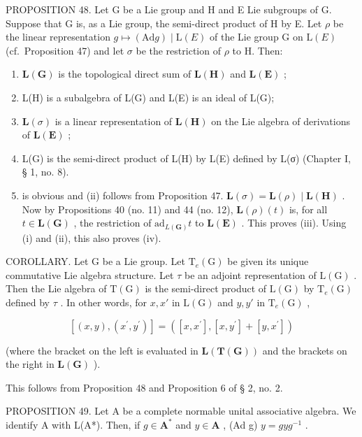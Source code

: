 PROPOSITION 48. Let G be a Lie group and H and E Lie subgroups of G. Suppose that G is, as a Lie group, the semi-direct product of H by E. Let \(\rho\) be the linear representation \(g \mapsto (\mathrm{Ad} g) \mid \mathrm{L}(E)\) of the Lie group G on \(\mathrm{L}(E)\) (cf.~Proposition 47) and let \(\sigma\) be the restriction of \(\rho\) to H. Then:

\begin{enumerate}
\def\labelenumi{(\roman{enumi})}
\item
  \(\mathbf{L}(\mathbf{G})\) is the topological direct sum of \(\mathbf{L}(\mathbf{H})\) and \(\mathbf{L}(\mathbf{E})\) ;
\item
  L(H) is a subalgebra of L(G) and L(E) is an ideal of L(G);
\item
  \(\mathbf{L}(\sigma)\) is a linear representation of \(\mathbf{L}(\mathbf{H})\) on the Lie algebra of derivations of \(\mathbf{L}(\mathbf{E})\) ;
\item
  L(G) is the semi-direct product of L(H) by L(E) defined by L(σ) (Chapter I, § 1, no. 8).
\item
  is obvious and (ii) follows from Proposition 47. \(\mathbf{L}(\sigma) = \mathbf{L}(\rho) \mid \mathbf{L}(\mathbf{H})\) . Now by Propositions 40 (no. 11) and 44 (no. 12), \(\mathbf{L}(\rho)(t)\) is, for all \(t \in \mathbf{L}(\mathbf{G})\) , the restriction of \(\mathrm{ad}_{L(\mathbf{G})} t\) to \(\mathbf{L}(\mathbf{E})\) . This proves (iii). Using (i) and (ii), this also proves (iv).
\end{enumerate}

COROLLARY. Let G be a Lie group. Let \(\mathrm{T}_{e}(\mathrm{G})\) be given its unique commutative Lie algebra structure. Let \(\tau\) be an adjoint representation of \(\mathrm{L}(\mathrm{G})\) . Then the Lie algebra of \(\mathrm{T}(\mathrm{G})\) is the semi-direct product of \(\mathrm{L}(\mathrm{G})\) by \(\mathrm{T}_{e}(\mathrm{G})\) defined by \(\tau\) . In other words, for \(x, x'\) in \(\mathrm{L}(\mathrm{G})\) and \(y, y'\) in \(\mathrm{T}_{e}(\mathrm{G})\) ,

\[
[ (x, y), (x ^ {\prime}, y ^ {\prime}) ] = ([ x, x ^ {\prime} ], [ x, y ^ {\prime} ] + [ y, x ^ {\prime} ])
\]

(where the bracket on the left is evaluated in \(\mathbf{L}(\mathbf{T}(\mathbf{G}))\) and the brackets on the right in \(\mathbf{L}(\mathbf{G})\) ).

This follows from Proposition 48 and Proposition 6 of § 2, no. 2.

PROPOSITION 49. Let A be a complete normable unital associative algebra. We identify A with L(A*). Then, if \(g \in \mathbf{A}^*\) and \(y \in \mathbf{A}\) , (Ad g) \(y = gyg^{-1}\) .

